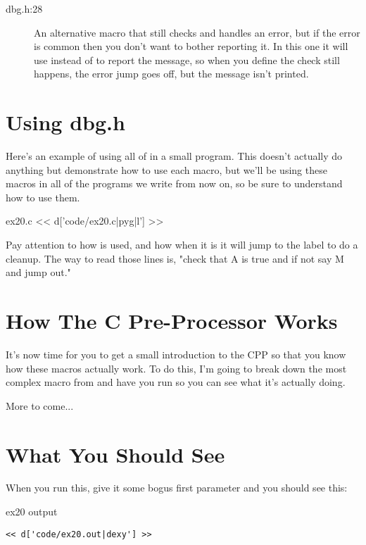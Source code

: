 \begin{description}
\item[dbg.h:28] An alternative macro  that still checks and
    handles an error, but if the error is common then you don't want to bother
    reporting it.  In this one it will use  instead of 
    to report the message, so when you define  the check still
    happens, the error jump goes off, but the message isn't printed.
\end{description}

\section{Using dbg.h}

Here's an example of using all of  in a small program.
This doesn't actually do anything but demonstrate how to use each
macro, but we'll be using these macros in all of the programs we
write from now on, so be sure to understand how to use them.

\begin{code}{ex20.c}
<< d['code/ex20.c|pyg|l'] >>
\end{code}

Pay attention to how  is used, and how when it is
 it will jump to the  label to do a cleanup.
The way to read those lines is, "check that A is true and if not say M
and jump out."


\section{How The C Pre-Processor Works}

It's now time for you to get a small introduction to the CPP so that you
know how these macros actually work.  To do this, I'm going to break down
the most complex macro from  and have you run  so
you can see what it's actually doing.

More to come...

\section{What You Should See}

When you run this, give it some bogus first parameter and you should see
this:

\begin{code}{ex20 output}
\begin{lstlisting}
<< d['code/ex20.out|dexy'] >>
\end{lstlisting}
\end{code}

